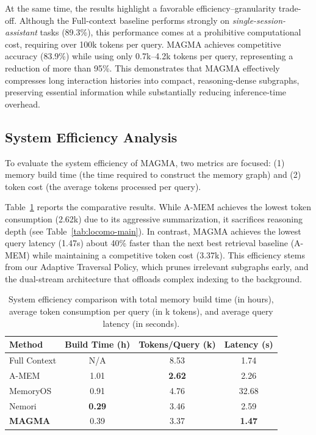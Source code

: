 \documentclass[11pt]{article}
\begin{document}
At the same time, the results highlight a favorable efficiency–granularity trade-off. Although the Full-context baseline performs strongly on \textit{single-session-assistant} tasks (89.3\%), this performance comes at a prohibitive computational cost, requiring over 100k tokens per query. MAGMA achieves competitive accuracy (83.9\%) while using only 0.7k--4.2k tokens per query, representing a reduction of more than 95\%. This demonstrates that MAGMA effectively compresses long interaction histories into compact, reasoning-dense subgraphs, preserving essential information while substantially reducing inference-time overhead.





\subsection{System Efficiency Analysis}
\label{sec:rq3}

To evaluate the system efficiency of MAGMA, two metrics are focused: (1) memory build time (the time required to construct the memory graph) and (2) token cost (the average tokens processed per query).

Table~\ref{tab:system_perf} reports the comparative results. While A-MEM achieves the lowest token consumption (2.62k) due to its aggressive summarization, it sacrifices reasoning depth (see Table~\ref{tab:locomo-main}). In contrast, MAGMA achieves the lowest query latency (1.47s) about 40\% faster than the next best retrieval baseline (A-MEM) while maintaining a competitive token cost (3.37k). This efficiency stems from our Adaptive Traversal Policy, which prunes irrelevant subgraphs early, and the dual-stream architecture that offloads complex indexing to the background.


\begin{table}[t]
\centering
\small
\setlength{\tabcolsep}{3pt}       
\caption{System efficiency comparison with total memory build time (in hours), average token consumption per query (in k tokens), and average query latency (in seconds).}
\label{tab:system_perf}
\begin{tabular}{l c c c}
\toprule
{Method} & {Build Time (h)} & {Tokens/Query (k)} & {Latency (s)} \\
\midrule
Full Context    & N/A & 8.53 & 1.74 \\
A-MEM           & 1.01 & \textbf{2.62} & 2.26 \\
MemoryOS        & 0.91 & 4.76          & 32.68 \\
Nemori          & \textbf{0.29} & 3.46 & 2.59 \\
\textbf{MAGMA}  & 0.39 & 3.37          & \textbf{1.47} \\ 
\bottomrule
\end{tabular}
\end{table}
\end{document}

